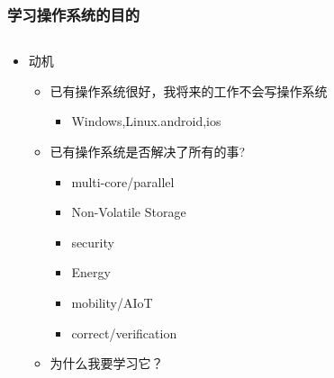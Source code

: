 \begin{frame}
    \frametitle{学习操作系统的目的}
    \begin{columns}[t]
    \begin{column}{0.5\textwidth}
    \begin{itemize}
    \item 动机
    \begin{itemize}
    \item 已有操作系统很好，我将来的工作不会写操作系统
    \begin{itemize}
        \item Windows,Linux.android,ios
    \end{itemize}
    \item 已有操作系统是否解决了所有的事?
        \begin{itemize}
        \item multi-core/parallel
        \item Non-Volatile Storage
        \item security
        \item Energy
        \item mobility/AIoT
        \item correct/verification
        \end{itemize}
    \item 为什么我要学习它？
       \end{itemize}
    \end{itemize}
     \end{column}
     

\end{columns}
\end{frame}
